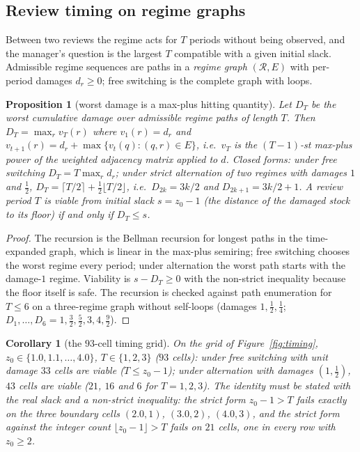 \documentclass[11pt,a4paper]{article}
\theoremstyle{plain}
\newtheorem{proposition}[theorem]{Proposition}
\newtheorem{corollary}[theorem]{Corollary}
\theoremstyle{definition}
\theoremstyle{remark}
\newcommand{\tfr}[2]{\tfrac{#1}{#2}}
\begin{document}
\subsection{Review timing on regime graphs}

Between two reviews the regime acts for $T$ periods without being observed, and the manager's question is the largest $T$ compatible with a given initial slack. Admissible regime sequences are paths in a \emph{regime graph} $(\mathcal{R},E)$ with per-period damages $d_r\ge 0$; free switching is the complete graph with loops.

\begin{proposition}[worst damage is a max-plus hitting quantity]\label{prop:maxplus}
Let $D_T$ be the worst cumulative damage over admissible regime paths of length $T$. Then $D_T=\max_{r}v_T(r)$ where $v_1(r)=d_r$ and $v_{t+1}(r)=d_r+\max\{v_t(q):(q,r)\in E\}$, i.e.\ $v_T$ is the $(T-1)$-st max-plus power of the weighted adjacency matrix applied to $d$. Closed forms: under free switching $D_T=T\max_r d_r$; under strict alternation of two regimes with damages $1$ and $\tfr12$, $D_T=\lceil T/2\rceil+\tfr12\lfloor T/2\rfloor$, i.e.\ $D_{2k}=3k/2$ and $D_{2k+1}=3k/2+1$. A review period $T$ is viable from initial slack $s=z_0-1$ (the distance of the damaged stock to its floor) if and only if $D_T\le s$.
\end{proposition}

\begin{proof}
The recursion is the Bellman recursion for longest paths in the time-expanded graph, which is linear in the max-plus semiring; free switching chooses the worst regime every period; under alternation the worst path starts with the damage-$1$ regime. Viability is $s-D_T\ge 0$ with the non-strict inequality because the floor itself is safe. The recursion is checked against path enumeration for $T\le 6$ on a three-regime graph without self-loops (damages $1,\tfr12,\tfr14$; $D_1,\dots,D_6=1,\tfr32,\tfr52,3,4,\tfr92$).
\end{proof}

\begin{corollary}[the $93$-cell timing grid]\label{cor:grid}
On the grid of Figure~\ref{fig:timing}, $z_0\in\{1.0,1.1,\dots,4.0\}$, $T\in\{1,2,3\}$ ($93$ cells): under free switching with unit damage $33$ cells are viable ($T\le z_0-1$); under alternation with damages $(1,\tfr12)$, $43$ cells are viable ($21$, $16$ and $6$ for $T=1,2,3$). The identity must be stated with the real slack and a non-strict inequality: the strict form $z_0-1>T$ fails exactly on the three boundary cells $(2.0,1)$, $(3.0,2)$, $(4.0,3)$, and the strict form against the integer count $\lfloor z_0-1\rfloor>T$ fails on $21$ cells, one in every row with $z_0\ge 2$.
\end{corollary}
\end{document}
